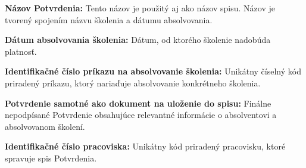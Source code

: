 \documentclass[
  digital,     %
  oneside,     %
  nosansbold,  %
  nocolorbold, %
  lof,         %
  nolot,         %
]{fithesis4}
\begin{document}
\noindent
\textbf{Názov Potvrdenia:} Tento názov je použitý aj ako názov spisu. Názov je tvorený spojením názvu školenia a dátumu absolvovania.

\noindent
\textbf{Dátum absolvovania školenia:} Dátum, od ktorého školenie nadobúda platnosť.

\noindent
\textbf{Identifikačné číslo príkazu na absolvovanie školenia:} Unikátny číselný kód priradený príkazu, ktorý nariaďuje absolvovanie konkrétneho školenia.

\noindent
\textbf{Potvrdenie samotné ako dokument na uloženie do spisu:} Finálne nepodpísané Potvrdenie obsahujúce relevantné informácie o absolventovi a absolvovanom školení.

\noindent
\textbf{Identifikačné číslo pracoviska:} Unikátny kód priradený pracovisku, ktoré spravuje spis Potvrdenia.
\end{document}
